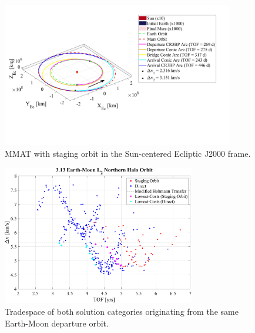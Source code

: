 \begin{figure}[H]
    \centering
    \includegraphics[width=0.9\textwidth]{figures/StagedMMAT.pdf}
    \caption{MMAT with staging orbit in the Sun-centered Ecliptic J2000 frame.}
    \label{fig:stagedMMAT}
\end{figure}

\begin{figure}[ht]
    \centering
    \includegraphics[width=0.75\textwidth]{figures/TradeSpace_L2Halo_3_13.pdf}
    \caption{Tradespace of both solution categories originating from the same Earth-Moon departure orbit.}
    \label{fig:tradespace}
\end{figure}

